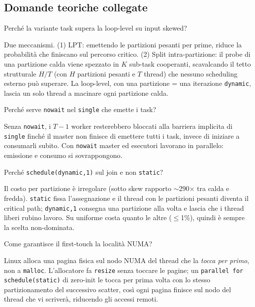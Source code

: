 \documentclass[11pt,a4paper]{article}
\theoremstyle{remark}
\newenvironment{esercizio}[1][]{%
  \begin{tcolorbox}[breakable,title={\textbf{Esercizio / Domanda d'esame}\ifx&#1&\else: #1\fi},
    colback=yellow!5!white, colframe=orange!75!black, fonttitle=\small\bfseries]%
}{%
  \end{tcolorbox}%
}
\newenvironment{risposta}{%
  \begin{tcolorbox}[breakable,title={\textbf{Risposta}},
    colback=green!5!white, colframe=green!50!black, fonttitle=\small\bfseries]%
}{%
  \end{tcolorbox}%
}
\begin{document}
\subsection{Domande teoriche collegate}

\begin{esercizio}[M3 -- Loop vs Task su skew]
Perch\'e la variante task supera la loop-level su input skewed?
\end{esercizio}
\begin{risposta}
Due meccanismi. (1) LPT: emettendo le partizioni pesanti per prime, riduce la probabilit\`a che finiscano sul percorso critico. (2) Split intra-partizione: il probe di una partizione calda viene spezzato in $K$ sub-task cooperanti, scavalcando il tetto strutturale $H/T$ (con $H$ partizioni pesanti e $T$ thread) che nessuno scheduling esterno pu\`o superare. La loop-level, con una partizione = una iterazione \texttt{dynamic}, lascia un solo thread a macinare ogni partizione calda.
\end{risposta}

\begin{esercizio}[M3 -- \texttt{nowait} su \texttt{single}]
Perch\'e serve \texttt{nowait} nel \texttt{single} che emette i task?
\end{esercizio}
\begin{risposta}
Senza \texttt{nowait}, i $T-1$ worker resterebbero bloccati alla barriera implicita di \texttt{single} finch\'e il master non finisce di emettere tutti i task, invece di iniziare a consumarli subito. Con \texttt{nowait} master ed esecutori lavorano in parallelo: emissione e consumo si sovrappongono.
\end{risposta}

\begin{esercizio}[M3 -- dynamic,1]
Perch\'e \texttt{schedule(dynamic,1)} sul join e non \texttt{static}?
\end{esercizio}
\begin{risposta}
Il costo per partizione \`e irregolare (sotto skew rapporto $\sim$290$\times$ tra calda e fredda). \texttt{static} fissa l'assegnazione e il thread con le partizioni pesanti diventa il critical path; \texttt{dynamic,1} consegna una partizione alla volta e lascia che i thread liberi rubino lavoro. Su uniforme costa quanto le altre ($\le$1\%), quindi \`e sempre la scelta non-dominata.
\end{risposta}

\begin{esercizio}[M3 -- NUMA first-touch]
Come garantisce il first-touch la localit\`a NUMA?
\end{esercizio}
\begin{risposta}
Linux alloca una pagina fisica sul nodo NUMA del thread che la \emph{tocca per primo}, non a \texttt{malloc}. L'allocatore fa \texttt{resize} senza toccare le pagine; un \texttt{parallel for schedule(static)} di zero-init le tocca per prima volta con lo stesso partizionamento del successivo scatter, cos\`i ogni pagina finisce sul nodo del thread che vi scriver\`a, riducendo gli accessi remoti.
\end{risposta}
\end{document}
